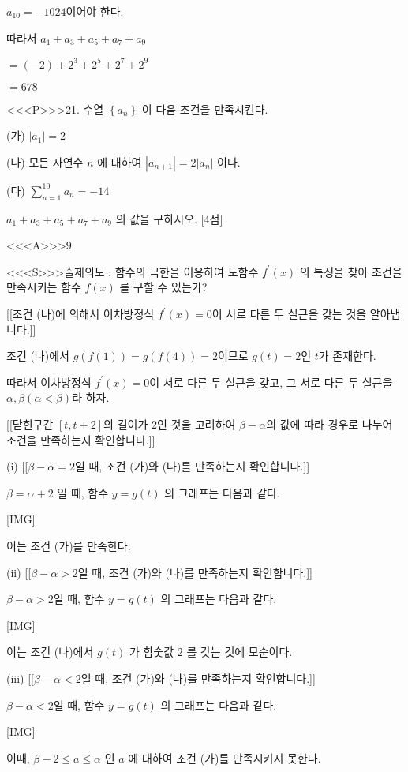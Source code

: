 \documentclass{oblivoir}
\begin{document}
$a_{10}=-1024$이어야 한다.

따라서
$a_{1}+a_{3}+a_{5}+a_{7}+a_{9}$

$=(-2)+2^{3}+2^{5}+2^{7}+2^{9}$

$=678$


<<<P>>>21. 수열 $\left\{a_{n}\right\}$ 이 다음 조건을 만족시킨다.

(가) $\left|a_{1}\right|=2$

(나) 모든 자연수 $n$ 에 대하여 $\left|a_{n+1}\right|=2\left|a_{n}\right|$ 이다.

(다) $\displaystyle\sum_{n=1}^{10} a_{n}=-14$

$a_{1}+a_{3}+a_{5}+a_{7}+a_{9}$ 의 값을 구하시오. [4점]


<<<A>>>$9$

<<<S>>>출제의도 : 함수의 극한을 이용하여 도함수 $f^{\prime}(x)$ 의 특징을 찾아 조건을 만족시키는 함수 $f(x)$ 를 구할 수 있는가?

[[조건 (나)에 의해서 이차방정식 $f^{\prime}(x)=0$이 서로 다른 두 실근을 갖는 것을 알아냅니다.]]

조건 (나)에서 $g(f(1))=g(f(4))=2$이므로 $g(t)=2$인 $t$가 존재한다.

따라서 이차방정식 $f^{\prime}(x)=0$이 서로 다른 두 실근을 갖고, 그 서로 다른 두 실근을 $\alpha, \beta(\alpha< \beta)$라 하자.

[[닫힌구간 $[t,t+2]$의 길이가 $2$인 것을 고려하여 $\beta-\alpha$의 값에 따라 경우로 나누어 조건을 만족하는지 확인합니다.]]

(i) [[$\beta-\alpha=2$일 때, 조건 (가)와 (나)를 만족하는지 확인합니다.]]

$\beta=\alpha+2$ 일 때, 함수 $y=g(t)$ 의 그래프는 다음과 같다.

[IMG]

이는 조건 (가)를 만족한다.

(ii) [[$\beta-\alpha>2$일 때, 조건 (가)와 (나)를 만족하는지 확인합니다.]]

$\beta-\alpha>2$일 때, 함수 $y=g(t)$ 의 그래프는 다음과 같다.

[IMG]

이는 조건 (나)에서 $g(t)$ 가 함숫값 $2$ 를 갖는 것에 모순이다.

(iii) [[$\beta-\alpha<2$일 때, 조건 (가)와 (나)를 만족하는지 확인합니다.]]

$\beta-\alpha<2$일 때, 함수 $y=g(t)$ 의 그래프는 다음과 같다.

[IMG]

이때, $\beta-2 \leq a \leq \alpha$ 인 $a$ 에 대하여 조건 (가)를 만족시키지 못한다.
\end{document}

